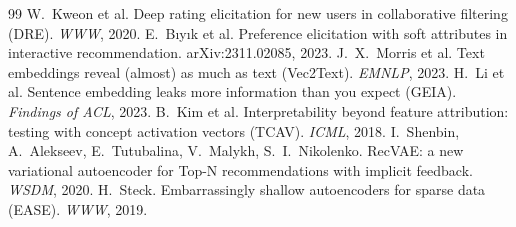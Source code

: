 \documentclass[11pt]{article}
\begin{document}
\begin{thebibliography}{99}
 W.~Kweon et al. Deep rating elicitation for new users in collaborative filtering (DRE). \emph{WWW}, 2020.
 E.~B{\i}y{\i}k et al. Preference elicitation with soft attributes in interactive recommendation. arXiv:2311.02085, 2023.
 J.~X.~Morris et al. Text embeddings reveal (almost) as much as text (Vec2Text). \emph{EMNLP}, 2023.
 H.~Li et al. Sentence embedding leaks more information than you expect (GEIA). \emph{Findings of ACL}, 2023.
 B.~Kim et al. Interpretability beyond feature attribution: testing with concept activation vectors (TCAV). \emph{ICML}, 2018.
 I.~Shenbin, A.~Alekseev, E.~Tutubalina, V.~Malykh, S.~I.~Nikolenko. RecVAE: a new variational autoencoder for Top-N recommendations with implicit feedback. \emph{WSDM}, 2020.
 H.~Steck. Embarrassingly shallow autoencoders for sparse data (EASE). \emph{WWW}, 2019.
\end{thebibliography}
\end{document}

